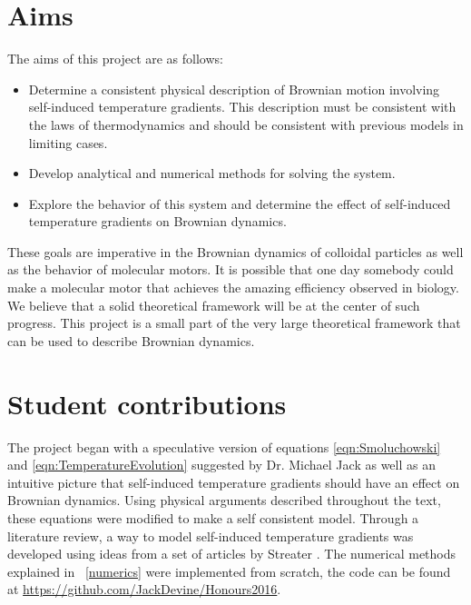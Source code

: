 \section{Aims}
The aims of this project are as follows:
\begin{itemize}
\item{Determine a consistent physical description of Brownian motion involving self-induced temperature gradients. This description must be consistent with the laws of thermodynamics and should be consistent with previous models in limiting cases.}
\item{Develop analytical and numerical methods for solving the system.}
\item{Explore the behavior of this system and determine the effect of self-induced temperature gradients on Brownian dynamics.}
\end{itemize}
These goals are imperative in the Brownian dynamics of colloidal particles as well as the behavior of molecular motors. It is possible that one day somebody could make a molecular motor that achieves the amazing efficiency observed in biology. We believe that a solid theoretical framework will be at the center of such progress. This project is a small part of the very large theoretical framework that can be used to describe Brownian dynamics.
\section{Student contributions}
The project began with a speculative version of equations \ref{eqn:Smoluchowski} and \ref{eqn:TemperatureEvolution} suggested by Dr. Michael Jack as well as an intuitive picture that self-induced temperature gradients should have an effect on Brownian dynamics. Using physical arguments described throughout the text, these equations were modified to make a self consistent model. Through a literature review, a way to model self-induced temperature gradients was developed using ideas from a set of articles by Streater \cite{Streater1997, Streater1997a,Streater2000,Streater1997b}. The numerical methods explained in ~\autoref{numerics} were implemented from scratch, the code can be found at \href{url}{https://github.com/JackDevine/Honours2016}.
